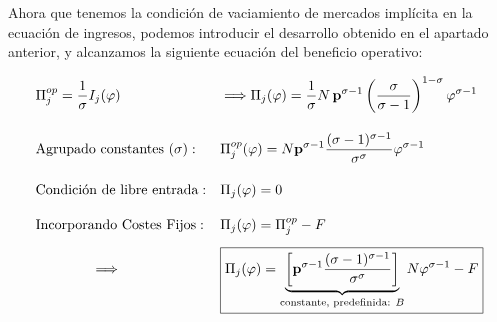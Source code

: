 \documentclass[10pt,a4paper]{article}
\begin{document}
Ahora que tenemos la condición de vaciamiento de mercados implícita en la ecuación de ingresos, podemos introducir el desarrollo obtenido en el apartado anterior, y alcanzamos la siguiente ecuación del beneficio operativo:

$$\begin{aligned}
    &\Pi_j^{op}=\frac{1}{\sigma}I_j(\varphi)&&\Longrightarrow\Pi_j(\varphi)=\frac{1}{\sigma}N\,\mathbf p^{\sigma-1}\left(\frac{\sigma}{\sigma-1}\right)^{1-\sigma}\varphi^{\sigma-1}\\[1em]
    &\text{Agrupado constantes ($\sigma$)}:&&\Pi_j^{op}(\varphi)=N\mathbf p^{\sigma-1}\frac{(\sigma-1)^{\sigma-1}}{\sigma^{\sigma}}\varphi^{\sigma-1}\\[1em]
    &\text{Condición de libre entrada}:&&\Pi_j(\varphi)=0\\[1em]
    &\text{Incorporando Costes Fijos}:&&\Pi_j(\varphi)=\Pi_j^{op}-F\\[0.5em]
    &\hspace{4em}\Longrightarrow&&\boxed{\Pi_j(\varphi)=\underbrace{\left[\mathbf p^{\sigma-1}\frac{(\sigma-1)^{\sigma-1}}{\sigma^{\sigma}}\right]}_{\text{\scriptsize constante, predefinida: $B$}}N\varphi^{\sigma-1}-F}
\end{aligned}$$
\end{document}
